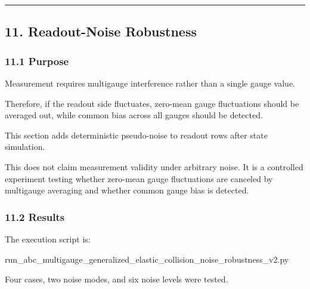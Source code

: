 \documentclass[
  a4paper,
]{article}
\newenvironment{Shaded}{}{}
\newcommand{\NormalTok}[1]{#1}
\begin{document}
\begin{center}\rule{0.5\linewidth}{0.5pt}\end{center}

\subsection{11. Readout-Noise
Robustness}\label{readout-noise-robustness}

\subsubsection{11.1 Purpose}\label{purpose-2}

Measurement requires multigauge interference rather than a single gauge
value.

Therefore, if the readout side fluctuates, zero-mean gauge fluctuations
should be averaged out, while common bias across all gauges should be
detected.

This section adds deterministic pseudo-noise to readout rows after state
simulation.

This does not claim measurement validity under arbitrary noise. It is a
controlled experiment testing whether zero-mean gauge fluctuations are
canceled by multigauge averaging and whether common gauge bias is
detected.

\subsubsection{11.2 Results}\label{results-3}

The execution script is:

\begin{Shaded}
\begin{Highlighting}[]
\NormalTok{run\_abc\_multigauge\_generalized\_elastic\_collision\_noise\_robustness\_v2.py}
\end{Highlighting}
\end{Shaded}

Four cases, two noise modes, and six noise levels were tested.
\end{document}
